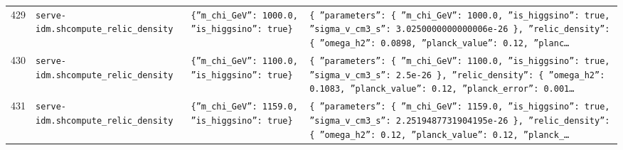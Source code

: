 \documentclass[11pt,a4paper]{article}
\begin{document}
\begin{longtable}{@{}p{}p{}p{}p{}@{}}
429 & \texttt{serve-idm.sh}\newline\texttt{compute\_\allowbreak{}relic\_\allowbreak{}density} & \texttt{\{''m\_\allowbreak{}chi\_\allowbreak{}GeV'':\allowbreak{} 1000.0,\allowbreak{} ''is\_\allowbreak{}higgsino'':\allowbreak{} true\}\allowbreak{}} & \texttt{\{   ''parameters'':\allowbreak{} \{     ''m\_\allowbreak{}chi\_\allowbreak{}GeV'':\allowbreak{} 1000.0,\allowbreak{}     ''is\_\allowbreak{}higgsino'':\allowbreak{} true,\allowbreak{}     ''sigma\_\allowbreak{}v\_\allowbreak{}cm3\_\allowbreak{}s'':\allowbreak{} 3.0250000000000006e-26   \}\allowbreak{},\allowbreak{}   ''relic\_\allowbreak{}density'':\allowbreak{} \{     ''omega\_\allowbreak{}h2'':\allowbreak{} 0.0898,\allowbreak{}     ''planck\_\allowbreak{}value'':\allowbreak{} 0.12,\allowbreak{}     ''planc\ldots{}\allowbreak{}} \\
430 & \texttt{serve-idm.sh}\newline\texttt{compute\_\allowbreak{}relic\_\allowbreak{}density} & \texttt{\{''m\_\allowbreak{}chi\_\allowbreak{}GeV'':\allowbreak{} 1100.0,\allowbreak{} ''is\_\allowbreak{}higgsino'':\allowbreak{} true\}\allowbreak{}} & \texttt{\{   ''parameters'':\allowbreak{} \{     ''m\_\allowbreak{}chi\_\allowbreak{}GeV'':\allowbreak{} 1100.0,\allowbreak{}     ''is\_\allowbreak{}higgsino'':\allowbreak{} true,\allowbreak{}     ''sigma\_\allowbreak{}v\_\allowbreak{}cm3\_\allowbreak{}s'':\allowbreak{} 2.5e-26   \}\allowbreak{},\allowbreak{}   ''relic\_\allowbreak{}density'':\allowbreak{} \{     ''omega\_\allowbreak{}h2'':\allowbreak{} 0.1083,\allowbreak{}     ''planck\_\allowbreak{}value'':\allowbreak{} 0.12,\allowbreak{}     ''planck\_\allowbreak{}error'':\allowbreak{} 0.001\ldots{}\allowbreak{}} \\
431 & \texttt{serve-idm.sh}\newline\texttt{compute\_\allowbreak{}relic\_\allowbreak{}density} & \texttt{\{''m\_\allowbreak{}chi\_\allowbreak{}GeV'':\allowbreak{} 1159.0,\allowbreak{} ''is\_\allowbreak{}higgsino'':\allowbreak{} true\}\allowbreak{}} & \texttt{\{   ''parameters'':\allowbreak{} \{     ''m\_\allowbreak{}chi\_\allowbreak{}GeV'':\allowbreak{} 1159.0,\allowbreak{}     ''is\_\allowbreak{}higgsino'':\allowbreak{} true,\allowbreak{}     ''sigma\_\allowbreak{}v\_\allowbreak{}cm3\_\allowbreak{}s'':\allowbreak{} 2.2519487731904195e-26   \}\allowbreak{},\allowbreak{}   ''relic\_\allowbreak{}density'':\allowbreak{} \{     ''omega\_\allowbreak{}h2'':\allowbreak{} 0.12,\allowbreak{}     ''planck\_\allowbreak{}value'':\allowbreak{} 0.12,\allowbreak{}     ''planck\_\allowbreak{}\ldots{}\allowbreak{}} \\

\end{longtable}
\end{document}
